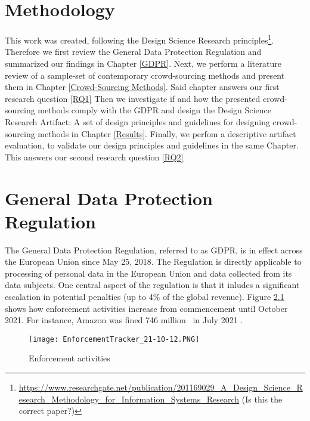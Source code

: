 \documentclass[a4paper,12pt]{report}
\begin{document}
	\chapter{Methodology}
	\startsection
		This work was created, following the Design Science Research principles\footnote{\url{https://www.researchgate.net/publication/201169029_A_Design_Science_Research_Methodology_for_Information_Systems_Research} (Is this the correct paper?)}.
		Therefore we first review the General Data Protection Regulation and summarized our findings in Chapter \ref{GDPR}.
		Next, we perform a literature review of a sample-set of contemporary crowd-sourcing methods and present them in Chapter \ref{Crowd-Sourcing Methods}.
		Said chapter answers our first research question \ref{RQ1} %
		Then we investigate if and how the presented crowd-sourcing methods comply with the GDPR and design the Design Science Research Artifact: A set of design principles and guidelines for designing crowd-sourcing methods in Chapter \ref{Results}. %
		Finally, we perfom a descriptive artifact evaluation, to validate our design principles and guidelines in the same Chapter.
		This answers our second research question \ref{RQ2} %
	\closesection


	\chapter{General Data Protection Regulation}  \label{GDPR}
	The General Data Protection Regulation, referred to as GDPR, is in effect across the European Union since May 25, 2018.
	The Regulation is directly applicable to processing of personal data in the European Union and data collected from its data subjects.
	One central aspect of the regulation is that it inludes a significant escalation in potential penalties (up to 4\% of the global revenue).
	Figure \ref{fig:enforcement_tracker} shows how enforcement activities increase from commencement until October 2021.
	For instance, Amazon was fined 746 million \texteuro \ in July 2021 \cite{EnforcementTracker}.
	\begin{figure}
		\centering
		\texttt{[image: EnforcementTracker\_21-10-12.PNG]}
		\caption{Enforcement activities \cite{EnforcementTracker}}
		\label{fig:enforcement_tracker}
	\end{figure}
	
\end{document}
